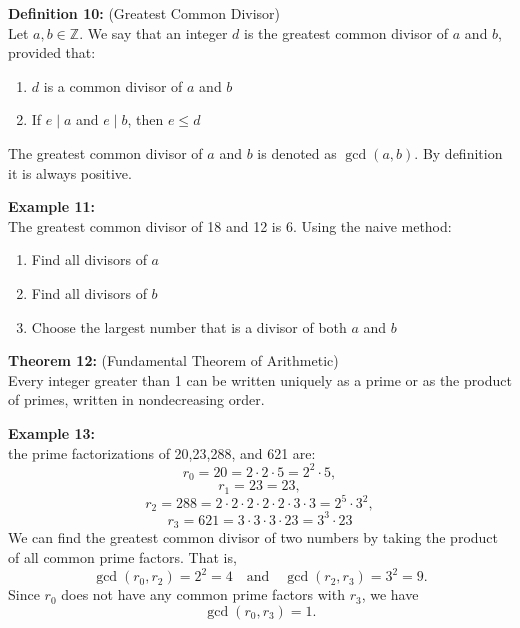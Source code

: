\documentclass[12pt]{article}
\begin{document}
\vspace{5mm}

\noindent\textbf{Definition 10:} (Greatest Common Divisor)
\label{def:gcd}
\\Let $a,b \in \mathbb{Z}$. We say that an integer $d$ is the greatest common divisor of $a$ and $b$, provided that:
\begin{enumerate}
    \item $d$ is a common divisor of $a$ and $b$
    \item If $e \mid a$ and $e \mid b$, then $e \leq d$
\end{enumerate}
The greatest common divisor of $a$ and $b$ is denoted as $\gcd(a,b)$. By definition it is always positive.

\vspace{5mm}

\noindent\textbf{Example 11:}
\label{ex:gcdnaive}
\\The greatest common divisor of 18 and 12 is 6. Using the naive method: 
\begin{enumerate}
    \item Find all divisors of $a$ 
    \item Find all divisors of $b$
    \item Choose the largest number that is a divisor of both $a$ and $b$
\end{enumerate}

\vspace{5mm}

\noindent\textbf{Theorem 12:} (Fundamental Theorem of Arithmetic)
\label{thm:fta}
\\Every integer greater than 1 can be written uniquely as a prime or as the product of primes, written in nondecreasing order.

\vspace{5mm}

\noindent\textbf{Example 13:}
\label{ex:primefact}
\\the prime factorizations of 20,23,288, and 621 are:
\[
r_0 = 20 = 2 \cdot 2 \cdot 5 = 2^2 \cdot 5, \]
\[
r_1 = 23 = 23, \]
\[
r_2 = 288 = 2 \cdot 2 \cdot 2 \cdot 2 \cdot 2 \cdot 3 \cdot 3 = 2^5 \cdot 3^2, \]
\[
r_3 = 621 = 3 \cdot 3 \cdot 3 \cdot 23 = 3^3 \cdot 23
\]
We can find the greatest common divisor of two numbers by taking the product of all common prime factors. That is, 
\[
\gcd(r_0, r_2) = 2^2 = 4 \quad \text{and} \quad \gcd(r_2, r_3) = 3^2 = 9.
\]
Since \(r_0\) does not have any common prime factors with \(r_3\), we have
\[
\gcd(r_0, r_3) = 1.
\]
\end{document}
